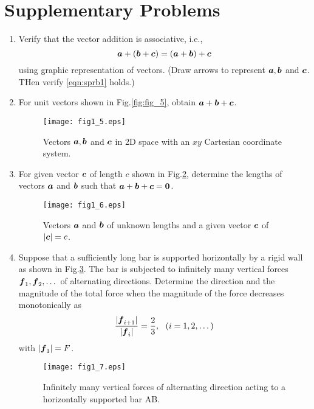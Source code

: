 \documentclass[10pt,a4j]{article}
\begin{document}
\section{Supplementary Problems}
\begin{enumerate}
\item
    Verify that the vector addition is associative, i.e., 
    \begin{equation}
        \mbox{\boldmath $a$}+(\mbox{\boldmath $b$}+\mbox{\boldmath $c$})= (\mbox{\boldmath $a$}+\mbox{\boldmath $b$})+\mbox{\boldmath $c$}
    \label{eqn:sprb1}
    \end{equation}
    using graphic representation of vectors. 
    (Draw arrows to represent $\mbox{\boldmath $a$},\mbox{\boldmath $b$}$ and $\mbox{\boldmath $c$}$. THen verify \ref{eqn:sprb1} holds.)
\item
    For unit vectors shown in Fig.\ref{fig:fig_5}, obtain $\mbox{\boldmath $a$}+\mbox{\boldmath $b$}+\mbox{\boldmath $c$}$.  
    \begin{figure}[h]
    \begin{center}
    \texttt{[image: fig1\_5.eps]} 
    \end{center}
    \caption{Vectors $\mbox{\boldmath $a$}, \mbox{\boldmath $b$}$ and $\mbox{\boldmath $c$}$ in 2D space with an $xy$ Cartesian coordinate system.}
    \label{fig:fig1_5}
    \end{figure}
\item
    For given vector $\mbox{\boldmath $c$}$ of length $c$ shown in Fig.\ref{fig:fig1_6}, determine the lengths of vectors 
    $\mbox{\boldmath $a$}$ and $\mbox{\boldmath $b$}$ such that $\mbox{\boldmath $a$}+\mbox{\boldmath $b$}+\mbox{\boldmath $c$}=\mbox{\boldmath $0$}$.
    \begin{figure}[h]
    \begin{center}
    \texttt{[image: fig1\_6.eps]} 
    \end{center}
        \caption{
            Vectors $\mbox{\boldmath $a$}$ and $\mbox{\boldmath $b$}$ of unknown lengths and a given vector $\mbox{\boldmath $c$}$ of $|\mbox{\boldmath $c$}|=c$.} 
    \label{fig:fig1_6}
    \end{figure}
\item
    Suppose that a sufficiently long bar is supported horizontally by a rigid wall as shown in Fig.\ref{fig:fig1_7}. The bar is subjected to infinitely many vertical forces $\mbox{\boldmath $f$}_1,\mbox{\boldmath $f$}_2,\dots $ of alternating directions. Determine the direction and the magnitude of the total force when the magnitude of the force decreases monotonically as 
    \begin{equation}
        \frac{| \mbox{\boldmath $f$}_{i+1}|}{|\mbox{\boldmath $f$}_i|}=\frac{2}{3}, \ \ (i=1,2,\dots)
        \label{eqn:}
    \end{equation}
 with $|\mbox{\boldmath $f$}_1|=F$.
    \begin{figure}[h]
    \begin{center}
    \texttt{[image: fig1\_7.eps]} 
    \end{center}
    \caption{Infinitely many vertical forces of alternating direction acting to a horizontally supported bar AB.}
    \label{fig:fig1_7}
    \end{figure}
\end{enumerate}
\end{document}

